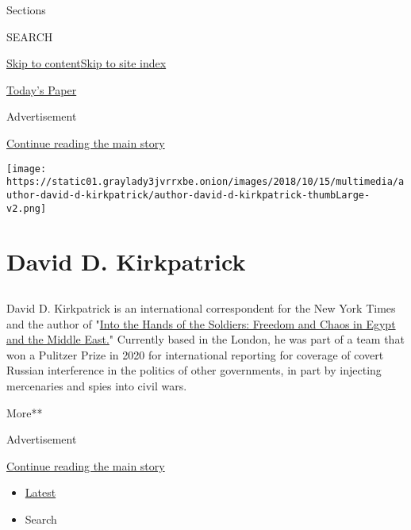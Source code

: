 Sections

SEARCH

\protect\hyperlink{site-content}{Skip to
content}\protect\hyperlink{site-index}{Skip to site index}

\href{https://myaccount.nytimes3xbfgragh.onion/auth/login?response_type=cookie\&client_id=vi}{}

\href{https://www.nytimes3xbfgragh.onion/section/todayspaper}{Today's
Paper}

Advertisement

\protect\hyperlink{after-top}{Continue reading the main story}

\texttt{[image: https://static01.graylady3jvrrxbe.onion/images/2018/10/15/multimedia/author-david-d-kirkpatrick/author-david-d-kirkpatrick-thumbLarge-v2.png]}

\hypertarget{david-d-kirkpatrick}{%
\section{David D. Kirkpatrick}\label{david-d-kirkpatrick}}

\subsection{}

David D. Kirkpatrick is an international correspondent for the New York
Times and the author of
"\href{https://www.penguinrandomhouse.com/search/into-the-hands-of-the-soldiers?q=into\%20the\%20hands\%20of\%20the\%20soldiers}{Into
the Hands of the Soldiers: Freedom and Chaos in Egypt and the Middle
East.}" Currently based in the London, he was part of a team that won a
Pulitzer Prize in 2020 for international reporting for coverage of
covert Russian interference in the politics of other governments, in
part by injecting mercenaries and spies into civil wars.

More**

Advertisement

\protect\hyperlink{after-mid1}{Continue reading the main story}

\begin{itemize}
\tightlist
\item
  \protect\hyperlink{stream-panel}{Latest}
\item
  Search
\end{itemize}

